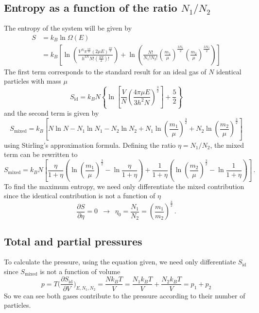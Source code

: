 \subsection{Entropy as a function of the ratio $N_1/N_2$}
	The entropy of the system will be given by
	\begin{align}
        S &= k_B \ln \Omega(E) \\
        &= k_B \left[\ln\left( \frac{V^N \pi^{\frac{3N}{2}} (2\mu E)^{\frac{3N}{2}}}{h^{3N}N!\left(\frac{3N}{2}\right)!} \right)
         + \ln\left( \frac{N!}{N_1!N_2!}\left( \frac{m_1}{\mu} \right)^{\frac{3N_1}{2}}\left( \frac{m_2}{\mu} \right)^{\frac{3N_2}{2}} \right)\right]
    \end{align}
    The first term corresponds to the standard result for an ideal gas of $N$ identical particles with mass $\mu$
    \begin{equation}
    S_{\text{id}} = k_B N \left\{ \ln\left[ \frac{V}{N} \left( \frac{4\pi\mu E}{3h^2N} \right)^{\frac{3}{2}}  \right] + \frac{5}{2} \right\} 
    \end{equation}
    and the second term is given by
    \begin{equation}
    S_{\text{mixed}} = k_B \left[ N\ln N - N_1\ln N_1 - N_2\ln N_2 + N_1 \ln\left(\frac{m_1}{\mu}\right)^{\frac{3}{2}} + N_2 \ln\left(\frac{m_2}{\mu}\right)^{\frac{3}{2}} \right]
    \end{equation}
    using Stirling's approximation formula. Defining the ratio $\eta = N_1/N_2$, the mixed term can be rewritten to
    \begin{equation}
    S_{\text{mixed}} = k_B N \left[ \frac{\eta}{1+\eta}\left( \ln\left( \frac{m_1}{\mu} \right)^{\frac{3}{2}} - \ln\frac{\eta}{1+\eta}\right) 
    + \frac{1}{1+\eta}\left( \ln\left( \frac{m_2}{\mu} \right)^{\frac{3}{2}} - \ln\frac{1}{1+\eta}\right) \right] \,.
    \end{equation}
    To find the maximum entropy, we need only differentiate the mixed contribution since the identical contribution is not a function of $\eta$
    \begin{equation}
    \frac{\partial S}{\partial \eta} = 0 \, \, \,  \longrightarrow  \, \, \,  \eta_0 = \frac{N_1}{N_2} = \left(\frac{m_1}{m_2}\right)^{\frac{3}{2}} \,.
    \end{equation}
    
    
\subsection{Total and partial pressures}
    To calculate the pressure, using the equation given, we need only differentiate $S_{\text{id}}$ since $S_{\text{mixed}}$ is not a function of volume
    \begin{equation}
        p=T\bigg(\frac{\partial S_{\text{id}}}{\partial V}\bigg)_{E,N_1,N_2} = \frac{N k_B T}{V} = \frac{N_1 k_B T}{V} + \frac{N_2 k_B T}{V} = p_1 + p_2
    \end{equation}
    So we can see both gases contribute to the pressure according to their number of particles.

